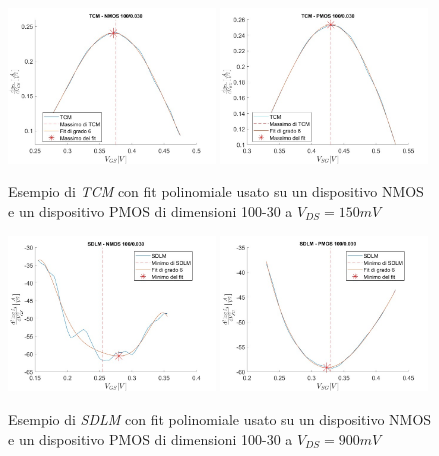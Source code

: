\documentclass[12pt, letterpaper]{book}
\begin{document}
\begin{figure}[H]
  \centering
  \includegraphics[width=0.49\textwidth]{TCM-N4-100-30}
  \includegraphics[width=0.49\textwidth]{TCM-P1-100-30}
  \caption{Esempio di \emph{TCM} con fit polinomiale usato su un dispositivo NMOS e un dispositivo PMOS di dimensioni 100-30 a $V_{DS} = 150 mV$}
  \includegraphics[width=0.49\textwidth]{SDLM-N4-100-30}
  \includegraphics[width=0.49\textwidth]{SDLM-P1-100-30}
  \caption{Esempio di \emph{SDLM} con fit polinomiale usato su un dispositivo NMOS e un dispositivo PMOS di dimensioni 100-30 a $V_{DS} = 900 mV$}
\end{figure}
\end{document}
